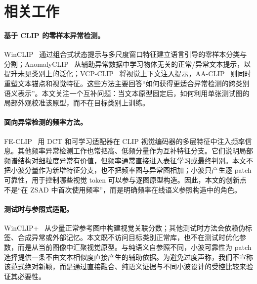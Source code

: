 \section{相关工作}
\label{sec:related}

\paragraph{基于 CLIP 的零样本异常检测。}
WinCLIP~\cite{jeong2023winclip} 通过组合式状态提示与多尺度窗口特征建立语言引导的零样本分类与分割；AnomalyCLIP~\cite{zhou2024anomalyclip} 从辅助异常数据中学习物体无关的正常/异常文本提示，以提升未见类别上的泛化；VCP-CLIP~\cite{qu2024vcpclip} 将视觉上下文注入提示，AA-CLIP~\cite{ma2025aaclip} 则同时重塑文本锚点和视觉特征。这些方法主要回答“如何获得更适合异常检测的跨类别语义表示”。本文关注一个互补问题：当文本原型固定后，如何利用单张测试图的局部外观校准该原型，而不在目标类别上训练。

\paragraph{面向异常检测的频率方法。}
FE-CLIP~\cite{gong2025feclip} 用 DCT 和可学习适配器在 CLIP 视觉编码器的多层特征中注入频率信息。其他频率异常检测工作也常把高、低频分量作为互补特征分支。它们说明局部频谱结构对细粒度异常有价值，但频率通常直接进入表征学习或最终判别。本文不把小波分量作为新增特征分支，也不把频率图与异常图相加；小波只产生逐 patch 可靠性，用于控制哪些视觉 token 可以参与逐图原型构造。因此，本文的创新点不是“在 ZSAD 中首次使用频率”，而是明确频率在线语义参照构造中的角色。

\paragraph{测试时与参照式适配。}
WinCLIP+~\cite{jeong2023winclip} 从少量正常参考图中构建视觉关联分数；其他测试时方法会依赖伪标签、合成异常或外部记忆。本文既不访问目标类别正常库，也不在测试时优化参数，而是从当前图像中汇聚视觉原型。与纯语义自参照不同，小波可靠性为 patch 选择提供一条不由文本相似度直接产生的辅助依据。为避免过度声称，我们不宣称该范式绝对新颖，而是通过直接融合、纯语义证据与不同小波设计的受控比较来验证其必要性。
